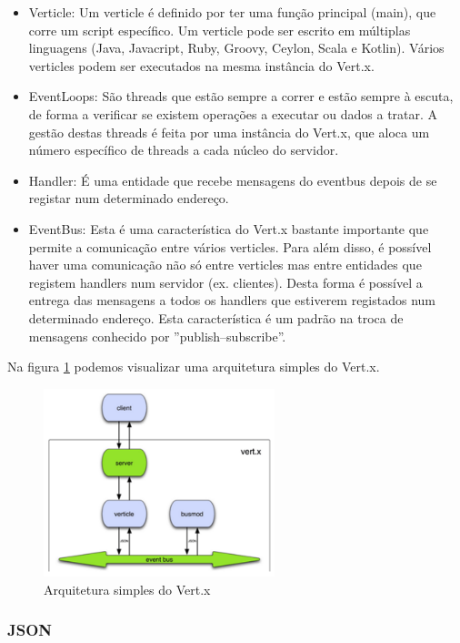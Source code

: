 \begin{itemize}
  \item Verticle: Um verticle é definido por ter uma função principal (main), que corre um script específico. Um verticle pode ser escrito em múltiplas linguagens (Java, Javacript, Ruby, Groovy, Ceylon, Scala e Kotlin). Vários verticles podem ser executados na mesma instância do Vert.x.
  \item EventLoops: São threads que estão sempre a correr e estão sempre à escuta, de forma a verificar se existem operações a executar ou dados a tratar. A gestão destas threads é feita por uma instância do Vert.x, que aloca um número específico de threads a cada núcleo do servidor.
  \item Handler: É uma entidade que recebe mensagens do eventbus depois de se registar num determinado endereço.
  \item EventBus: Esta é uma característica do Vert.x bastante importante que permite a comunicação entre vários verticles. Para além disso, é possível haver uma comunicação não só entre verticles mas entre entidades que registem handlers num servidor (ex. clientes). Desta forma é possível a entrega das mensagens a todos os handlers que estiverem registados num determinado endereço. Esta característica é um padrão na troca de mensagens conhecido por ''publish–subscribe''.
\end{itemize}

Na figura \ref{f:vertxarch} podemos visualizar uma arquitetura simples do Vert.x. \cite{vertx-study}

\begin{figure}[H]
  \centering
  \includegraphics[width=0.6\textwidth]{imgs/vertx_arch.png}
  \caption[Arquitetura simples do Vert.x]{Arquitetura simples do Vert.x \cite{vertx-study}}
  \label{f:vertxarch}
\end{figure}


\subsubsection{JSON}

